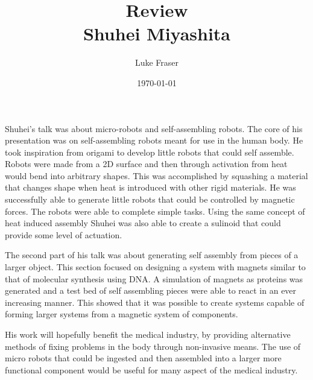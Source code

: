 \documentclass{article}
\begin{document}
\title{{\large Review} \\ Shuhei Miyashita}
\author{Luke Fraser}
\date{\today}
\maketitle

\begingroup
\renewcommand{\section}[2]{}


\endgroup

\section*{Summary}
Shuhei's talk was about micro-robots and self-assembling robots. The core of his presentation was on self-assembling robots meant for use in the human body. He took inspiration from origami to develop little robots that could self assemble. Robots were made from a 2D surface and then through activation from heat would bend into arbitrary shapes. This was accomplished by squashing a material that changes shape when heat is introduced with other rigid materials. He was successfully able to generate little robots that could be controlled by magnetic forces. The robots were able to complete simple tasks. Using the same concept of heat induced assembly Shuhei was also able to create a sulinoid that could provide some level of actuation.

The second part of his talk was about generating self assembly from pieces of a larger object. This section focused on designing a system with magnets similar to that of molecular synthesis using DNA. A simulation of magnets as proteins was generated and a test bed of self assembling pieces were able to react in an ever increasing manner. This showed that it was possible to create systems capable of forming larger systems from a magnetic system of components.

His work will hopefully benefit the medical industry, by providing alternative methods of fixing problems in the body through non-invasive means. The use of micro robots that could be ingested and then assembled into a larger more functional component would be useful for many aspect of the medical industry.
\end{document}
